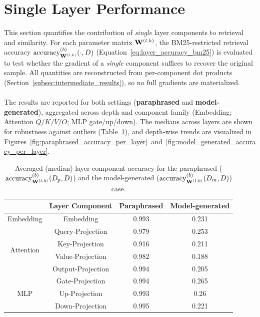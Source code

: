 \section{Single Layer Performance}\label{sec:single_layer_perf}
This section quantifies the contribution of \emph{single} layer components to retrieval and similarity. For each parameter matrix $\mathbf{W}^{(l,k)}$, the BM25-restricted retrieval accuracy $\operatorname{accuracy}^{(b)}_{\mathbf{W}^{(l,k)}}(\cdot,D)$ (Equation~\ref{eq:layer_accuracy_bm25}) is evaluated to test whether the gradient of a \emph{single} component suffices to recover the original sample. All quantities are reconstructed from per-component dot products (Section~\ref{subsec:intermediate_results}), so no full gradients are materialized.
\\\\
The results are reported for both settings (\textbf{paraphrased} and \textbf{model-generated}), aggregated across depth and component family (Embedding; Attention $Q/K/V/O$; MLP gate/up/down). The medians across layers are shown for robustness against outliers (Table~\ref{tab:average_accuracy_layer_component}), and depth-wise trends are visualized in Figures~\ref{fig:paraphrased_accuracy_per_layer}~and~\ref{fig:model_generated_accuracy_per_layer}.
\begin{table}[H]
    \centering
    \begin{tabular}{|c|c|c|c|}
        \hline
        & \textbf{Layer Component} & \textbf{Paraphrased} & \textbf{Model-generated} \\
        \hline
        \multirow{1}{5em}{Embedding}
        & Embedding & 0.993 & 0.231 \\
        \hline
        \multirow{4}{5em}{Attention}
        & Query-Projection & 0.979 & 0.253 \\
        & Key-Projection & 0.916 & 0.211 \\
        & Value-Projection & 0.982 & 0.188 \\
        & Output-Projection & 0.994 & 0.205 \\
        \hline
        \multirow{3}{5em}{MLP}
        & Gate-Projection & 0.994 & 0.265 \\
        & Up-Projection & 0.993 & 0.26 \\
        & Down-Projection & 0.995 & 0.221 \\
        \hline
    \end{tabular}
    \caption{Averaged (median) layer component accuracy for the paraphrased ($\operatorname{accuracy}^{(b)}_{\mathbf{W}^{(l,k)}}(D_p,D)$) and the model-generated ($\operatorname{accuracy}^{(b)}_{\mathbf{W}^{(l,k)}}(D_m,D)$) case.}
    \label{tab:average_accuracy_layer_component}
\end{table}
